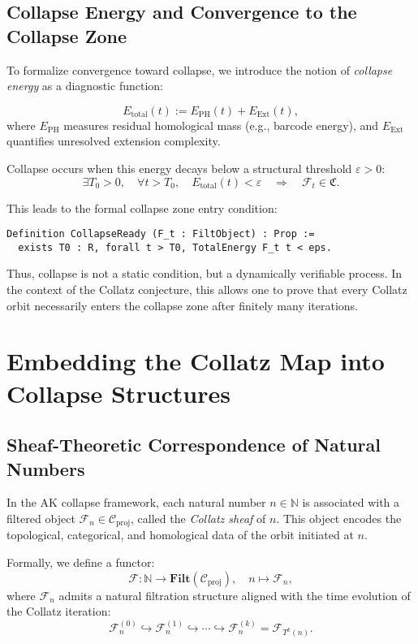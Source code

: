 \documentclass[11pt]{article}
\begin{document}
\subsection{Collapse Energy and Convergence to the Collapse Zone}

To formalize convergence toward collapse, we introduce the notion of \emph{collapse energy} as a diagnostic function:

\[
E_{\mathrm{total}}(t) := E_{\mathrm{PH}}(t) + E_{\mathrm{Ext}}(t),
\]
where \( E_{\mathrm{PH}} \) measures residual homological mass (e.g., barcode energy), and \( E_{\mathrm{Ext}} \) quantifies unresolved extension complexity.

Collapse occurs when this energy decays below a structural threshold \( \varepsilon > 0 \):
\[
\exists T_0 > 0,\quad \forall t > T_0,\quad E_{\mathrm{total}}(t) < \varepsilon \quad \Rightarrow \quad \mathcal{F}_t \in \mathfrak{C}.
\]

This leads to the formal collapse zone entry condition:

\begin{lstlisting}[language=Coq]
Definition CollapseReady (F_t : FiltObject) : Prop :=
  exists T0 : R, forall t > T0, TotalEnergy F_t t < eps.
\end{lstlisting}


Thus, collapse is not a static condition, but a dynamically verifiable process. In the context of the Collatz conjecture, this allows one to prove that every Collatz orbit necessarily enters the collapse zone after finitely many iterations.



\section{Embedding the Collatz Map into Collapse Structures}

\subsection{Sheaf-Theoretic Correspondence of Natural Numbers}

In the AK collapse framework, each natural number \( n \in \mathbb{N} \) is associated with a filtered object \( \mathcal{F}_n \in \mathcal{C}_{\mathrm{proj}} \), called the \emph{Collatz sheaf} of \( n \). This object encodes the topological, categorical, and homological data of the orbit initiated at \( n \).

Formally, we define a functor:
\[
\mathcal{F} : \mathbb{N} \longrightarrow \mathbf{Filt}(\mathcal{C}_{\mathrm{proj}}), \quad n \mapsto \mathcal{F}_n,
\]
where \( \mathcal{F}_n \) admits a natural filtration structure aligned with the time evolution of the Collatz iteration:
\[
\mathcal{F}_n^{(0)} \hookrightarrow \mathcal{F}_n^{(1)} \hookrightarrow \cdots \hookrightarrow \mathcal{F}_n^{(k)} = \mathcal{F}_{T^k(n)}.
\]
\end{document}
